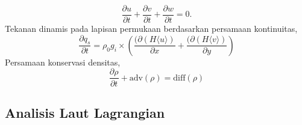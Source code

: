 \documentclass{beamer}
\begin{document}
\begin{frame}[allowframebreaks]
\begin{equation}
		\frac{\partial u}{\partial t} + \frac{\partial v}{\partial t} + \frac{\partial w}{\partial t} = 0.
	\end{equation}
	Tekanan dinamis pada lapisan permukaan berdasarkan persamaan kontinuitas,
	\begin{equation}
		\frac{\partial q_s}{\partial t} = \rho_0 g_i \times \left( \frac{(\partial \left(H \langle u \rangle \right)} {\partial x} + \frac{(\partial \left(H \langle v \rangle \right)} {\partial y}\right)
	\end{equation}
	Persamaan konservasi densitas,
		\begin{equation}
		\frac{\partial \rho}{\partial t} + \text{adv}(\rho) = \text{diff}(\rho)
	\end{equation}
\end{frame}
	
\subsection{Analisis Laut Lagrangian}
\end{document}
